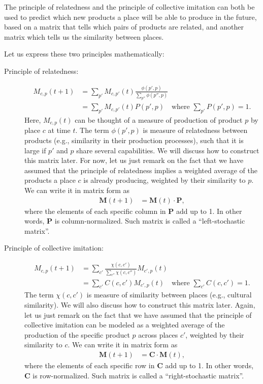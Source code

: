 \documentclass[12pt]{article}
\newcommand{\mtx}[1]{\mathbf{ #1}}
\begin{document}
The principle of relatedness and the principle of collective imitation can both be used to predict which new products a place will be able to produce in the future, based on a matrix that tells which pairs of products are related, and another matrix which tells us the similarity between places.

Let us express these two principles mathematically: 
\begin{description}
	\item[Principle of relatedness:]
	\begin{align}
		M_{c,p}(t+1) &= \sum_{p'} M_{c,p'}(t)\frac{\phi(p', p)}{\sum_{p''}\phi(p'', p)} \nonumber\\
		&= \sum_{p'} M_{c,p'}(t)P(p', p)\quad\text{where $\sum_{p'} P(p', p) = 1$}.
	\end{align}
	Here, $M_{c,p}(t)$ can be thought of a measure of production of product $p$ by place $c$ at time $t$. The term $\phi(p', p)$ is measure of relatedness between products (e.g., similarity in their production processes), such that it is large if $p'$ and $p$ share several capabilities. We will discuss how to construct this matrix later. For now, let us just remark on the fact that we have assumed that the principle of relatedness implies a weighted average of the products a place $c$ is already producing, weighted by their similarity to $p$. We can write it in matrix form as
\begin{align}
	\mtx{M}(t+1) &= \mtx{M}(t)\cdot \mtx{P},
\label{eq_relatedness}
\end{align}
where the elements of each specific column in $\mtx{P}$ add up to 1. In other words, $\mtx{P}$ is column-normalized. Such matrix is called a ``left-stochastic matrix''.

	\item[Principle of collective imitation:]
	\begin{align}
		M_{c,p}(t+1) &= \sum_{c'} \frac{\chi(c, c')}{\sum_{c''}\chi(c, c'')} M_{c',p}(t) \nonumber\\
		&= \sum_{c'} C(c,c')M_{c',p}(t)\quad\text{where $\sum_{c'} C(c, c') = 1$}.
	\end{align}
	The term $\chi(c, c')$ is measure of similarity between places (e.g., cultural similarity). We will also discuss how to construct this matrix later. Again, let us just remark on the fact that we have assumed that the principle of collective imitation can be modeled as a weighted average of the production of the specific product $p$ across places $c'$, weighted by their similarity to $c$. We can write it in matrix form as
\begin{align}
	\mtx{M}(t+1) &= \mtx{C}\cdot\mtx{M}(t),
\label{eq_imitation}
\end{align}
where the elements of each specific row in $\mtx{C}$ add up to 1. In other words, $\mtx{C}$ is row-normalized. Such matrix is called a ``right-stochastic matrix''.
\end{description}
\end{document}

